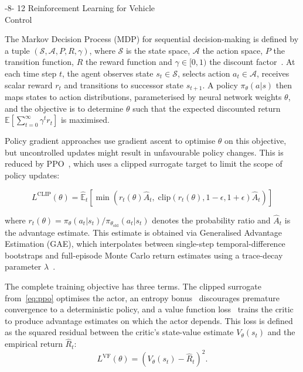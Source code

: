 \documentclass{sig-alternate}
\makeatletter
\renewcommand\subsection{\@startsection{subsection}{2}{\z@}%
    {-8\p@ \@plus -2\p@ \@minus -\p@}%
    {12\p@}%
    {\secfnt}}
\makeatother
\begin{document}
\subsection{Reinforcement Learning for Vehicle\\Control}

The Markov Decision Process (MDP) for sequential decision-making is defined by a tuple $(\mathcal{S}, \mathcal{A}, P, R, \gamma)$, where $\mathcal{S}$ is the state space, $\mathcal{A}$ the action space, $P$ the transition function, $R$ the reward function and $\gamma \in [0,1)$ the discount factor~\cite{sutton2018rl, thrun2005probabilistic}. At each time step $t$, the agent observes state $s_t \in \mathcal{S}$, selects action $a_t \in \mathcal{A}$, receives scalar reward $r_t$ and transitions to successor state $s_{t+1}$. A policy $\pi_\theta(a|s)$ then maps states to action distributions, parameterised by neural network weights $\theta$, and the objective is to determine $\theta$ such that the expected discounted return $\mathbb{E}[\sum_{t=0}^{\infty} \gamma^t r_t]$ is maximised. 

Policy gradient approaches use gradient ascent to optimise $\theta$ on this objective, but uncontrolled updates might result in unfavourable policy changes. This is reduced by PPO~\cite{schulman2017ppo}, which uses a clipped surrogate target to limit the scope of policy updates:

\begin{equation}
    L^{\text{CLIP}}(\theta) = \hat{\mathbb{E}}_t \left[ \min \left( r_t(\theta) \hat{A}_t, \; \text{clip}(r_t(\theta), 1{-}\epsilon, 1{+}\epsilon) \hat{A}_t \right) \right]
    \label{eq:ppo}
\end{equation}

\noindent where $r_t(\theta) = \pi_\theta(a_t|s_t) / \pi_{\theta_{\text{old}}}(a_t|s_t)$ denotes the probability ratio and $\hat{A}_t$ is the advantage estimate. This estimate is obtained via Generalised Advantage Estimation (GAE), which interpolates between single-step temporal-difference bootstraps and full-episode Monte Carlo return estimates using a trace-decay parameter $\lambda$~\cite{schulman2015gae}.

The complete training objective has three terms. The clipped surrogate from~\cref{eq:ppo} optimises the actor, an entropy bonus~\cite{mnih2016a3c} discourages premature convergence to a deterministic policy, and a value function loss~\cite{schulman2017ppo} trains the critic to produce advantage estimates on which the actor depends. This loss is defined as the squared residual between the critic's state-value estimate $V_\theta(s_t)$ and the empirical return $\hat{R}_t$:
\begin{equation}
    L^{\text{VF}}(\theta) = \left( V_\theta(s_t) - \hat{R}_t \right)^2.
\label{eq:vf_loss}
\end{equation}
\end{document}
